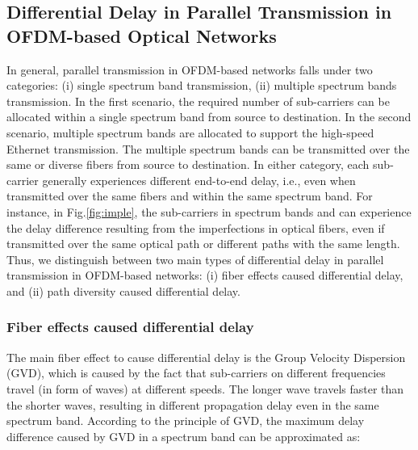 \documentclass[conference]{IEEEtran}
\begin{document}
\subsection{Differential Delay in Parallel Transmission in  OFDM-based Optical Networks}  
\par In general, parallel transmission in OFDM-based networks falls  under two categories: (i) single spectrum band transmission, (ii) multiple spectrum bands transmission. In the first scenario,  the required number of sub-carriers can be allocated within a single spectrum band from source to destination. In the second scenario, multiple spectrum bands are allocated to support the high-speed Ethernet transmission. The multiple spectrum bands can be transmitted over the same or diverse fibers from source to destination. In either category, each sub-carrier generally experiences different end-to-end delay, i.e., even when transmitted over the same fibers and within the same spectrum band. For instance, in Fig.\ref{fig:imple}, the sub-carriers in spectrum bands  and  can experience the delay difference resulting from the imperfections in optical fibers, even if transmitted over the same optical path or different paths with the same length. Thus, we distinguish between two main types of differential delay in parallel transmission in OFDM-based networks: (i) fiber effects caused differential delay, and (ii) path diversity caused differential delay.

\subsubsection{Fiber effects caused differential delay} 
The main fiber effect to cause differential delay is the Group Velocity Dispersion (GVD), which is caused by the fact that sub-carriers on different frequencies travel (in form of waves) at different speeds. The longer wave travels faster than the shorter waves, resulting in different propagation delay even in the same spectrum band.  According to the principle of GVD, the maximum delay difference caused by GVD in a spectrum band can be approximated as: 
\end{document}
